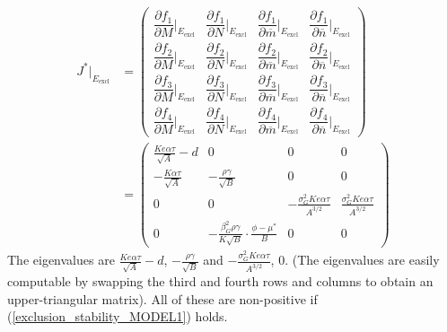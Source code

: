 \documentclass{amsart}
\theoremstyle{definition}
\theoremstyle{remark}
\numberwithin{equation}{section}
\begin{document}
\begin{align*}
	J^*|_{E_{\text{excl}}} &= \left(\begin{array}{cccc}
		\dfrac{\partial f_1}{\partial M}\Big|_{E_{\text{excl}}} & \dfrac{\partial f_1}{\partial N}\Big|_{E_{\text{excl}}} & \dfrac{\partial f_1}{\partial \overline{m}}\Big|_{E_{\text{excl}}} & \dfrac{\partial f_1}{\partial \overline{n}}\Big|_{E_{\text{excl}}} \\[10px]
		\dfrac{\partial f_2}{\partial M}\Big|_{E_{\text{excl}}} & \dfrac{\partial f_2}{\partial N}\Big|_{E_{\text{excl}}} & \dfrac{\partial f_2}{\partial \overline{m}}\Big|_{E_{\text{excl}}} & \dfrac{\partial f_2}{\partial \overline{n}}\Big|_{E_{\text{excl}}} \\[10px]
		\dfrac{\partial f_3}{\partial M}\Big|_{E_{\text{excl}}} & \dfrac{\partial f_3}{\partial N}\Big|_{E_{\text{excl}}} & \dfrac{\partial f_3}{\partial \overline{m}}\Big|_{E_{\text{excl}}} & \dfrac{\partial f_3}{\partial \overline{n}}\Big|_{E_{\text{excl}}} \\[10px]
		\dfrac{\partial f_4}{\partial M}\Big|_{E_{\text{excl}}} & \dfrac{\partial f_4}{\partial N}\Big|_{E_{\text{excl}}} & \dfrac{\partial f_4}{\partial \overline{m}}\Big|_{E_{\text{excl}}} & \dfrac{\partial f_4}{\partial \overline{n}}\Big|_{E_{\text{excl}}}
	\end{array}\right) \\
	&= \left(\begin{array}{cccc}
		\frac{Ke\alpha\tau}{\sqrt{A}} - d & 0 & 0 & 0 \\
		-\frac{K\alpha\tau}{\sqrt{A}} & -\frac{\rho\gamma}{\sqrt{B}} & 0 & 0 \\
		0 & 0 & -\frac{\sigma_G^2Ke\alpha\tau}{A^{3/2}} & \frac{\sigma_G^2Ke\alpha\tau}{A^{3/2}} \\
		0 & -\frac{\beta_G^2\rho\gamma}{K\sqrt{B}}\cdot\frac{\phi - \mu^*}{B} & 0 & 0
	\end{array}\right)
\end{align*}
The eigenvalues are $\frac{Ke\alpha\tau}{\sqrt{A}} - d$, $-\frac{\rho\gamma}{\sqrt{B}}$ and $-\frac{\sigma_G^2Ke\alpha\tau}{A^{3/2}}$, $0$.  (The eigenvalues are easily computable by swapping the third and fourth rows and columns to obtain an upper-triangular matrix).  All of these are non-positive if (\ref{exclusion_stability_MODEL1}) holds.
\end{document}
